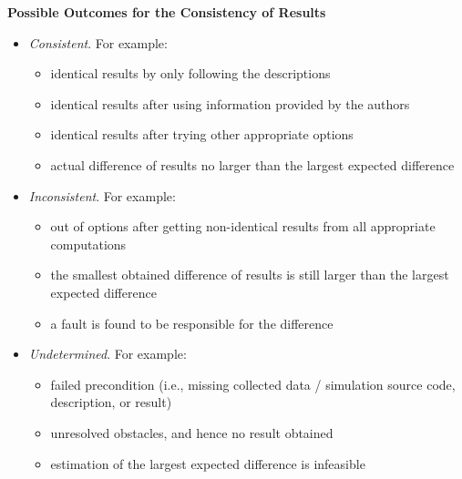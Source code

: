 \documentclass[authordate, meta]{jote-new-article}
\begin{document}
	\begin{rightWide}[Box 3]
	\textbf{Possible Outcomes for the Consistency of Results}
	
	\begin{itemize}
		\item \emph{Consistent}.  For example:
		\begin{itemize}[leftmargin=2.5em, label={\hspace{1em}\textendash}]
			\item identical results by only following the descriptions
			\item identical results after using information provided by the authors
			\item identical results after trying other appropriate options
			\item actual difference of results no larger than the largest expected difference
		\end{itemize}
		\item \emph{Inconsistent}. For example:
		\begin{itemize}[leftmargin=2.5em, label={\hspace{1em}\textendash}]
			\item out of options after getting non-identical results from all appropriate computations
			\item the smallest obtained difference of results is still larger than the largest expected difference
			\item a fault is found to be responsible for the difference
		\end{itemize}
		\item \emph{Undetermined}. For example:
		 \begin{itemize}[leftmargin=2.5em, label={\hspace{1em}\textendash}]
			\item failed precondition (i.e., missing collected data / simulation source code, description, or result)
			\item unresolved obstacles, and hence no result obtained
			\item  estimation of the largest expected difference is infeasible
		\end{itemize}
	\end{itemize}
	\end{rightWide}
\end{document}
